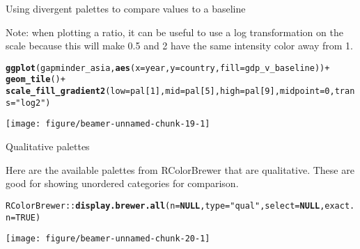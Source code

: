 \documentclass[table]{beamer}\usepackage[]{graphicx}\usepackage[]{color}
\makeatletter
\def\maxwidth{ %
  \ifdim\Gin@nat@width>\linewidth
    \linewidth
  \else
    \Gin@nat@width
  \fi
}
\newcommand{\hlnum}[1]{\textcolor[rgb]{0.686,0.059,0.569}{#1}}%
\newcommand{\hlstr}[1]{\textcolor[rgb]{0.192,0.494,0.8}{#1}}%
\newcommand{\hlopt}[1]{\textcolor[rgb]{0,0,0}{#1}}%
\newcommand{\hlstd}[1]{\textcolor[rgb]{0.345,0.345,0.345}{#1}}%
\newcommand{\hlkwa}[1]{\textcolor[rgb]{0.161,0.373,0.58}{\textbf{#1}}}%
\newcommand{\hlkwc}[1]{\textcolor[rgb]{0.333,0.667,0.333}{#1}}%
\newcommand{\hlkwd}[1]{\textcolor[rgb]{0.737,0.353,0.396}{\textbf{#1}}}%
\newenvironment{kframe}{%
 \def\at@end@of@kframe{}%
 \ifinner\ifhmode%
  \def\at@end@of@kframe{\end{minipage}}%
  \begin{minipage}{\columnwidth}%
 \fi\fi%
 \def\FrameCommand##1{\hskip\@totalleftmargin \hskip-\fboxsep
 \colorbox{shadecolor}{##1}\hskip-\fboxsep
     \hskip-\linewidth \hskip-\@totalleftmargin \hskip\columnwidth}%
 \MakeFramed {\advance\hsize-\width
   \@totalleftmargin\z@ \linewidth\hsize
   \@setminipage}}%
 {\par\unskip\endMakeFramed%
 \at@end@of@kframe}
\newenvironment{knitrout}{}{} %
\makeatother
\begin{document}

\begin{frame}[fragile]{Using divergent palettes to compare values to a baseline}

Note: when plotting a ratio, it can be useful to use a log transformation on the scale because this will make 0.5 and 2 have the same intensity color away from 1.
\begin{knitrout}\tiny
{}\color{fgcolor}\begin{kframe}
\begin{alltt}
\hlkwd{ggplot}\hlstd{(gapminder_asia,} \hlkwd{aes}\hlstd{(}\hlkwc{x}\hlstd{=year,} \hlkwc{y}\hlstd{=country,} \hlkwc{fill}\hlstd{=gdp_v_baseline))} \hlopt{+}
    \hlkwd{geom_tile}\hlstd{()} \hlopt{+}
    \hlkwd{scale_fill_gradient2}\hlstd{(}\hlkwc{low}\hlstd{=pal[}\hlnum{1}\hlstd{],} \hlkwc{mid}\hlstd{=pal[}\hlnum{5}\hlstd{],} \hlkwc{high}\hlstd{=pal[}\hlnum{9}\hlstd{],} \hlkwc{midpoint} \hlstd{=} \hlnum{0}\hlstd{,} \hlkwc{trans}\hlstd{=}\hlstr{"log2"}\hlstd{)}
\end{alltt}
\end{kframe}

{\centering \texttt{[image: figure/beamer-unnamed-chunk-19-1]} 

}


\end{knitrout}

\end{frame}



\begin{frame}[fragile]{Qualitative palettes}

Here are the available palettes from RColorBrewer that are qualitative. These are good for showing unordered categories for comparison.
\begin{knitrout}\tiny
{}\color{fgcolor}\begin{kframe}
\begin{alltt}
\hlstd{RColorBrewer}\hlopt{::}\hlkwd{display.brewer.all}\hlstd{(}\hlkwc{n}\hlstd{=}\hlkwa{NULL}\hlstd{,} \hlkwc{type}\hlstd{=}\hlstr{"qual"}\hlstd{,} \hlkwc{select}\hlstd{=}\hlkwa{NULL}\hlstd{,} \hlkwc{exact.n}\hlstd{=}\hlnum{TRUE}\hlstd{)}
\end{alltt}
\end{kframe}

{\centering \texttt{[image: figure/beamer-unnamed-chunk-20-1]} 

}


\end{knitrout}

\end{frame}
\end{document}
